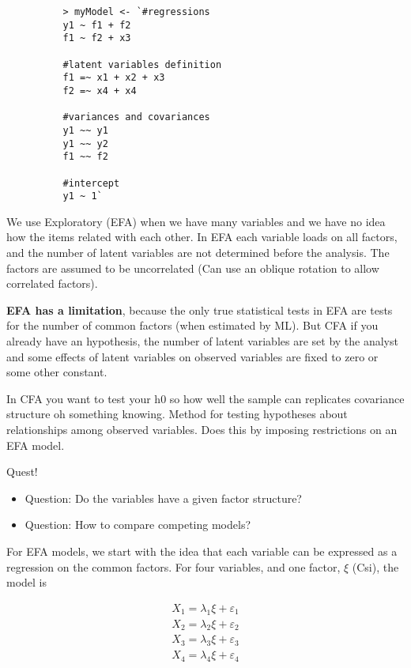 \documentclass[
]{article}
\providecommand{\tightlist}{%
  \setlength{\itemsep}{0pt}\setlength{\parskip}{0pt}}
\begin{document}
\begin{verbatim}
          > myModel <- `#regressions
          y1 ~ f1 + f2
          f1 ~ f2 + x3
          
          #latent variables definition
          f1 =~ x1 + x2 + x3
          f2 =~ x4 + x4
          
          #variances and covariances
          y1 ~~ y1
          y1 ~~ y2
          f1 ~~ f2
          
          #intercept
          y1 ~ 1`
\end{verbatim}

We use Exploratory (EFA) when we have many variables and we have no idea
how the items related with each other. In EFA each variable loads on all
factors, and the number of latent variables are not determined before
the analysis. The factors are assumed to be uncorrelated (Can use an
oblique rotation to allow correlated factors).

\textbf{EFA has a limitation}, because the only true statistical tests
in EFA are tests for the number of common factors (when estimated by
ML). But CFA if you already have an hypothesis, the number of latent
variables are set by the analyst and some effects of latent variables on
observed variables are fixed to zero or some other constant.

In CFA you want to test your h0 so how well the sample can replicates
covariance structure oh something knowing. Method for testing hypotheses
about relationships among observed variables. Does this by imposing
restrictions on an EFA model.

Quest!

\begin{itemize}
\tightlist
\item
  Question: Do the variables have a given factor structure?
\item
  Question: How to compare competing models?
\end{itemize}

For EFA models, we start with the idea that each variable can be
expressed as a regression on the common factors. For four variables, and
one factor, \(\xi\) (Csi), the model is

\[\begin{align} 
X_{1}=\lambda_{1}\xi+\varepsilon_{1}\\ 
X_{2}=\lambda_{2}\xi+\varepsilon_{2}\\
X_{3}=\lambda_{3}\xi+\varepsilon_{3}\\ 
X_{4}=\lambda_{4}\xi+\varepsilon_{4}
\end{align}\]
\end{document}
